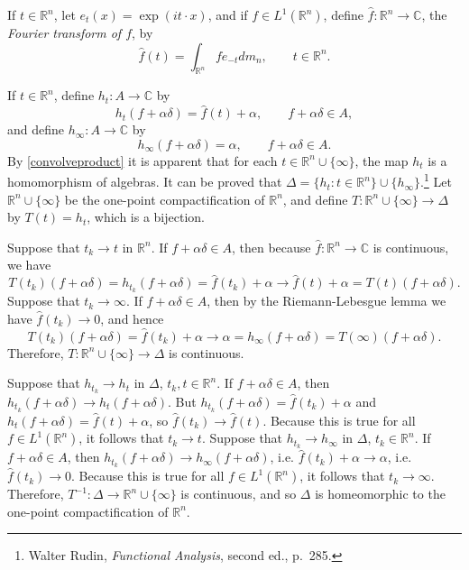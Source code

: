 \documentclass{article}
\theoremstyle{definition}
\begin{document}
If $t \in \mathbb{R}^n$, let $e_t(x) = \exp(it\cdot x)$, and if $f \in L^1(\mathbb{R}^n)$, define $\hat{f}:\mathbb{R}^n \to \mathbb{C}$, 
the {\em Fourier transform of $f$}, by
\[
\hat{f}(t) = \int_{\mathbb{R}^n} fe_{-t} dm_n, \qquad t \in \mathbb{R}^n.
\]

If $t \in \mathbb{R}^n$, define $h_t:A \to \mathbb{C}$ by 
\[
h_t(f+\alpha \delta) = \hat{f}(t)+\alpha, \qquad f+\alpha \delta \in A,
\]
and  define $h_\infty:A \to \mathbb{C}$ by
\[
h_\infty(f+\alpha \delta)=\alpha, \qquad f+\alpha \delta \in A.
\]
By \eqref{convolveproduct} it is apparent that  for each $t \in \mathbb{R}^n \cup \{\infty\}$, the map $h_t$ is a homomorphism of algebras.
It can be proved that $\Delta=\{h_t: t \in \mathbb{R}^n\} \cup \{h_\infty\}$.\footnote{Walter
Rudin, {\em Functional Analysis}, second ed., p.~285.}
Let $\mathbb{R}^n \cup \{\infty\}$  be the one-point compactification of $\mathbb{R}^n$, and
define $T:\mathbb{R}^n \cup \{\infty\} \to \Delta$ by $T(t)=h_t$, which is  a bijection.

Suppose that $t_k \to t$ in $\mathbb{R}^n$. If $f+\alpha \delta \in A$, then because
 $\hat{f}:\mathbb{R}^n \to \mathbb{C}$ is continuous, we have
 \[
 T(t_k)(f+\alpha \delta) = h_{t_k}(f+\alpha \delta) = \hat{f}(t_k)+\alpha \to \hat{f}(t)+\alpha = T(t)(f+\alpha \delta).
 \]
 Suppose that $t_k \to \infty$. If $f+\alpha \delta \in A$, then by the Riemann-Lebesgue lemma we have $\hat{f}(t_k) \to 0$, and hence
 \[
 T(t_k)(f+\alpha \delta) =  \hat{f}(t_k) + \alpha \to \alpha = h_\infty(f+\alpha \delta) = T(\infty)(f+\alpha \delta).
 \]
Therefore, $T:\mathbb{R}^n \cup \{\infty\} \to \Delta$ is continuous. 

Suppose that $h_{t_k} \to h_t$ in $\Delta$, $t_k, t \in \mathbb{R}^n$. If $f+\alpha \delta \in A$, then
$h_{t_k}(f+\alpha \delta) \to h_t(f+\alpha \delta)$. But $h_{t_k}(f+\alpha \delta)=\hat{f}(t_k) + \alpha$
and $h_t(f+\alpha \delta)=\hat{f}(t)+\alpha$, so $\hat{f}(t_k) \to \hat{f}(t)$. Because this is true for all $f \in L^1(\mathbb{R}^n)$, it follows that
$t_k \to t$.
Suppose that $h_{t_k} \to h_\infty$ in $\Delta$, $t_k \in \mathbb{R}^n$. If $f+\alpha \delta \in A$, then
$h_{t_k}(f+\alpha \delta) \to h_\infty(f+\alpha \delta)$, i.e.
$\hat{f}(t_k)+\alpha \to \alpha$, i.e. $\hat{f}(t_k) \to 0$. Because this is true for all $f \in L^1(\mathbb{R}^n)$, it follows that $t_k \to \infty$.
Therefore, $T^{-1}:\Delta \to \mathbb{R}^n \cup \{\infty\}$ is continuous, and so $\Delta$ is homeomorphic
to the one-point compactification of $\mathbb{R}^n$.
\end{document}
